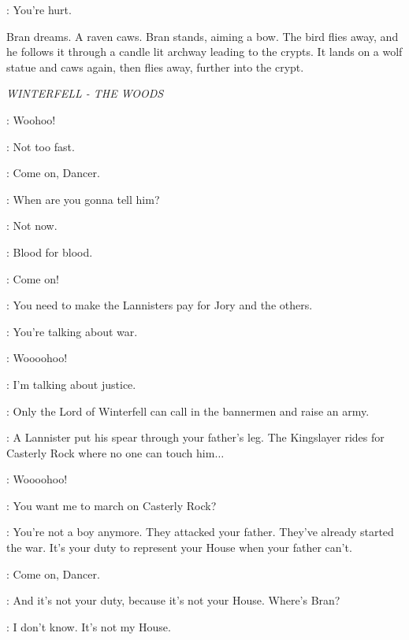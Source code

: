 \DAENERYS:  You're hurt. 


\scene

\n Bran dreams. A raven caws. Bran stands, aiming a bow. The bird flies away, and he follows it through a candle lit archway leading to the crypts. It lands on a wolf statue and caws again, then flies away, further into the crypt.

\scene

\textit{WINTERFELL - THE WOODS} 


\BRAN:  Woohoo! 

\ROBB:  Not too fast. 

\BRAN:  Come on, Dancer. 

\THEON:  When are you gonna tell him? 

\ROBB:  Not now. 

\THEON:  Blood for blood. 

\BRAN:  Come on! 

\THEON:  You need to make the Lannisters pay for Jory and the others. 

\ROBB:  You're talking about war. 

\BRAN: Woooohoo! 

\THEON:  I'm talking about justice. 

\ROBB:  Only the Lord of Winterfell can call in the bannermen and raise an army. 

\THEON:  A Lannister put his spear through your father's leg. The Kingslayer rides for Casterly Rock where no one can touch him$\ldots$ 

\BRAN: Woooohoo! 

\ROBB:  You want me to march on Casterly Rock? 

\THEON:  You're not a boy anymore. They attacked your father. They've already started the war. It's your duty to represent your House when your father can't. 

\BRAN: Come on, Dancer. 


\ROBB:  And it's not your duty, because it's not your House.  Where's Bran? 

\THEON: I don't know. It's not my House. 



